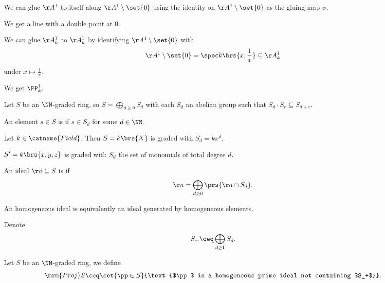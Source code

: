\documentclass[10pt,a4paper,twoside,openany,hidelinks]{book}
\begin{document}
\begin{example}
We can glue $\AA^1$ to itself along $\AA^1 \setminus \set{0}$ using the identity on $\AA^1 \setminus \set{0}$ as the gluing map $\phi$.

We get a line with a double point at $0$.
\end{example}

\begin{example}
We can glue $\AA_k^1$ to $\AA_k^1$ by identifying $\AA^1 \setminus \set{0}$ with \[\AA^1 \setminus \set{0} = \spec k\brs{x, \frac{1}{x}} \subseteq \AA^1_k\]
under $x \mapsto \frac{1}{x}$.

We get $\PP_k^1$.
\end{example}

Let $S$ be an $\NN$-graded ring, so $S = \bigoplus_{d \geq 0} S_d$ with each $S_d$ an abelian group such that $S_d \cdot S_e \subseteq S_{d + e}$.

\begin{definition}
An element $s \in S$ is  if $s \in S_d$ for some $d \in \NN$.
\end{definition}

\begin{example}
Let $k \in \catname{Field}$. Then $S = k\brs{X}$ is graded with $S_d = k x^d$.

$S' = k\brs{x,y,z}$ is graded with $S_d$ the set of monomials of total degree $d$.
\end{example}

\begin{definition}
An ideal $\aa \subseteq S$ is  if
\[\aa = \bigoplus_{d \geq 0} \prs{\aa \cap S_d} \text{.}\]
\end{definition}

\begin{fact}
An homogeneous ideal is equivalently an ideal generated by homogeneous elements.
\end{fact}

\begin{notation}
Denote \[S_+ \ceq \bigoplus_{d \geq 1} S_d \text{.}\]
\end{notation}

\begin{definition}
Let $S$ be an $\NN$-graded ring, we define
\[\mrm{Proj} S \ceq \set{\pp \in S}{\text{$\pp$ is a homogeneous prime ideal not containing $S_+$}} \text{.}\]
\end{definition}
\end{document}
